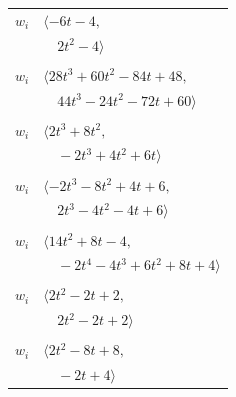 \documentclass[11pt]{article}
\begin{document}
\begin{longtable}{@{}ll@{}}
$w_i$ & $\langle -6t-4,$\\
 & $\quad 2t^{2}-4\rangle$\\
\addlinespace[2pt]
\multicolumn{2}{@{}p{0.97\textwidth}@{}}{$i=29$, $D_i=1$, $\rho_{ij}$: $0{:}1, \allowbreak 2{:}2, \allowbreak 3{:}2, \allowbreak 5{:}2, \allowbreak 9{:}1, \allowbreak 19{:}1, \allowbreak 24{:}2, \allowbreak 31{:}2, \allowbreak 37{:}2, \allowbreak 41{:}1$}\\
$w_i$ & $\langle 28t^{3}+60t^{2}-84t+48,$\\
 & $\quad 44t^{3}-24t^{2}-72t+60\rangle$\\
\addlinespace[2pt]
\multicolumn{2}{@{}p{0.97\textwidth}@{}}{$i=30$, $D_i=1$, $\rho_{ij}$: $10{:}1, \allowbreak 16{:}2, \allowbreak 24{:}2, \allowbreak 27{:}2, \allowbreak 32{:}1, \allowbreak 33{:}2, \allowbreak 36{:}1$}\\
$w_i$ & $\langle 2t^{3}+8t^{2},$\\
 & $\quad -2t^{3}+4t^{2}+6t\rangle$\\
\addlinespace[2pt]
\multicolumn{2}{@{}p{0.97\textwidth}@{}}{$i=31$, $D_i=1$, $\rho_{ij}$: $3{:}1, \allowbreak 5{:}2, \allowbreak 12{:}2, \allowbreak 14{:}1, \allowbreak 24{:}1, \allowbreak 27{:}2, \allowbreak 29{:}1$}\\
$w_i$ & $\langle -2t^{3}-8t^{2}+4t+6,$\\
 & $\quad 2t^{3}-4t^{2}-4t+6\rangle$\\
\addlinespace[2pt]
\multicolumn{2}{@{}p{0.97\textwidth}@{}}{$i=32$, $D_i=1$, $\rho_{ij}$: $7{:}1, \allowbreak 15{:}2, \allowbreak 19{:}1, \allowbreak 20{:}1, \allowbreak 22{:}1, \allowbreak 25{:}1, \allowbreak 27{:}2, \allowbreak 30{:}2, \allowbreak 33{:}1, \allowbreak 41{:}2$}\\
$w_i$ & $\langle 14t^{2}+8t-4,$\\
 & $\quad -2t^{4}-4t^{3}+6t^{2}+8t+4\rangle$\\
\addlinespace[2pt]
\multicolumn{2}{@{}p{0.97\textwidth}@{}}{$i=33$, $D_i=1$, $\rho_{ij}$: $0{:}2, \allowbreak 23{:}1, \allowbreak 30{:}1, \allowbreak 32{:}2, \allowbreak 35{:}1$}\\
$w_i$ & $\langle 2t^{2}-2t+2,$\\
 & $\quad 2t^{2}-2t+2\rangle$\\
\addlinespace[2pt]
\multicolumn{2}{@{}p{0.97\textwidth}@{}}{$i=34$, $D_i=1$, $\rho_{ij}$: $25{:}2, \allowbreak 26{:}2, \allowbreak 27{:}2, \allowbreak 36{:}2, \allowbreak 39{:}1$}\\
$w_i$ & $\langle 2t^{2}-8t+8,$\\
 & $\quad -2t+4\rangle$\\

\end{longtable}
\end{document}
